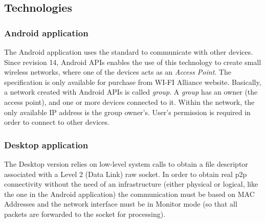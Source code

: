 \subsection{Technologies}

\subsubsection{Android application}
The Android application uses the \direct standard to communicate with other devices. Since revision 14, Android APIs enables the use of this technology to create small wireless networks, where one of the devices acts as an \emph{Access Point}. The \direct specification is only available for purchase from WI-FI Alliance\textsuperscript{\texttrademark} website\cite{wifi_direct}.
Basically, a network created with Android \direct APIs is called \emph{group}. A \emph{group} has an owner (the access point), and one or more devices connected to it. Within the network, the only available IP address is the group owner's. 
User's permission is required in order to connect to other devices.

\subsubsection{Desktop application}
The Desktop version relies on low-level system calls to obtain a file descriptor associated with a Level 2 (Data Link) raw socket. In order to obtain real p2p connectivity without the need of an infrastructure (either physical or logical, like the one in the Android application) the communication must be based on MAC Addresses and the network interface must be in Monitor mode (so that all packets are forwarded to the socket for processing).
